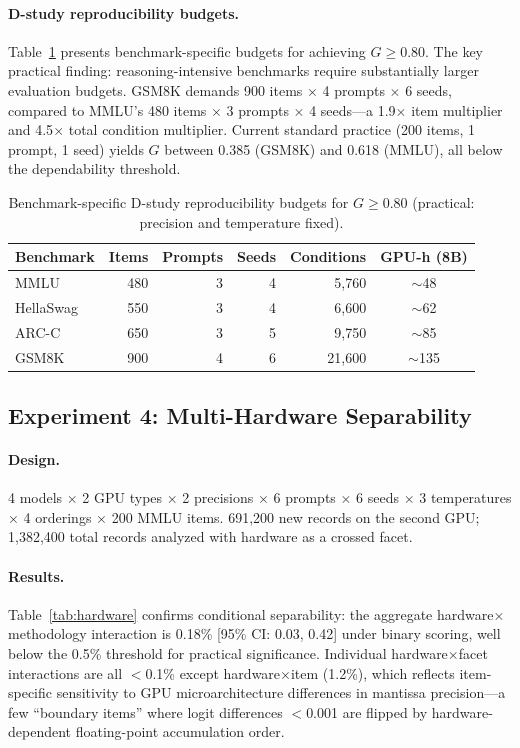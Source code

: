 \documentclass[letterpaper]{article}
\newcommand{\gcoeff}{\ensuremath{G}}
\newcommand{\pct}{\%}
\begin{document}
\paragraph{D-study reproducibility budgets.}
Table~\ref{tab:dstudy-budget} presents benchmark-specific budgets for achieving $\gcoeff{} \geq 0.80$.
The key practical finding: reasoning-intensive benchmarks require substantially larger evaluation budgets.
GSM8K demands 900 items $\times$ 4 prompts $\times$ 6 seeds, compared to MMLU's 480 items $\times$ 3 prompts $\times$ 4 seeds---a 1.9$\times$ item multiplier and 4.5$\times$ total condition multiplier.
Current standard practice (200 items, 1 prompt, 1 seed) yields $\gcoeff{}$ between 0.385 (GSM8K) and 0.618 (MMLU), all below the dependability threshold.

\begin{table}[t]
\centering
\caption{Benchmark-specific D-study reproducibility budgets for $\gcoeff{}\geq 0.80$ (practical: precision and temperature fixed).}
\label{tab:dstudy-budget}
\small
\begin{tabular}{lrrrrc}
\toprule
Benchmark & Items & Prompts & Seeds & Conditions & GPU-h (8B) \\
\midrule
MMLU      & 480  & 3 & 4 & 5,760  & $\sim$48 \\
HellaSwag & 550  & 3 & 4 & 6,600  & $\sim$62 \\
ARC-C     & 650  & 3 & 5 & 9,750  & $\sim$85 \\
GSM8K     & 900  & 4 & 6 & 21,600 & $\sim$135 \\
\bottomrule
\end{tabular}
\end{table}

\subsection{Experiment 4: Multi-Hardware Separability}

\paragraph{Design.}
4 models $\times$ 2 GPU types $\times$ 2 precisions $\times$ 6 prompts $\times$ 6 seeds $\times$ 3 temperatures $\times$ 4 orderings $\times$ 200 MMLU items.
691,200 new records on the second GPU; 1,382,400 total records analyzed with hardware as a crossed facet.

\paragraph{Results.}
Table~\ref{tab:hardware} confirms conditional separability: the aggregate hardware$\times$methodology interaction is 0.18\pct{} [95\pct{} CI: 0.03, 0.42] under binary scoring, well below the 0.5\pct{} threshold for practical significance.
Individual hardware$\times$facet interactions are all $<$0.1\pct{} except hardware$\times$item (1.2\pct{}), which reflects item-specific sensitivity to GPU microarchitecture differences in mantissa precision---a few ``boundary items'' where logit differences $<$0.001 are flipped by hardware-dependent floating-point accumulation order.
\end{document}
